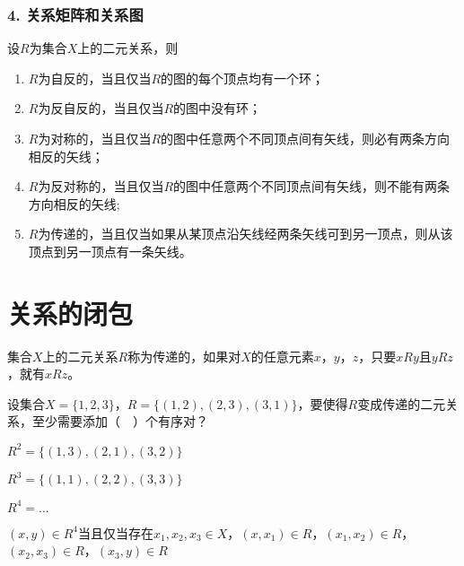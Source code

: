 \documentclass{beamer}
\begin{document}
\begin{CJK*}{UTF8}{gbsn}
\begin{frame}
\begin{tikzpicture}[auto,
    specification/.style ={circle, draw, thick}]
\end{tikzpicture}

\end{frame}

\begin{frame}
  \frametitle{4. 关系矩阵和关系图}
  \begin{Thm}
  设$R$为集合$X$上的二元关系，则
  \begin{enumerate}[(1)]
  \item $R$为自反的，当且仅当$R$的图的每个顶点均有一个环；
  \item $R$为反自反的，当且仅当$R$的图中没有环；
  \item $R$为对称的，当且仅当$R$的图中任意两个不同顶点间有矢线，则必有两条方向相反的矢线；
  \item $R$为反对称的，当且仅当$R$的图中任意两个不同顶点间有矢线，则不能有两条方向相反的矢线;
  \item $R$为传递的，当且仅当如果从某顶点沿矢线经两条矢线可到另一顶点，则从该顶点到另一顶点有一条矢线。
  \end{enumerate}
\end{Thm}
\end{frame}


\section{关系的闭包}
\begin{frame}
  集合$X$上的二元关系$R$称为传递的，如果对$X$的任意元素$x$，$y$，$z$，只要$xRy$且$yRz$，就有$xRz$。

设集合$X=\{1,2,3\}$，$R=\{(1,2),(2,3),(3,1)\}$，要使得$R$变成传递的二元关系，至少需要添加（　）个有序对？

\pause

$R^2=\{(1,3),(2,1),(3,2)\}$

\pause

$R^3=\{(1,1),(2,2),(3,3)\}$

\pause 

$R^4=...$

$(x,y)\in R^4$当且仅当存在$x_1,x_2,x_3\in X$，$(x,x_1)\in R$，$(x_1,x_2)\in R$，$(x_2,x_3)\in R$，$(x_3,y)\in R$
\end{frame}


\end{CJK*}
\end{document}
